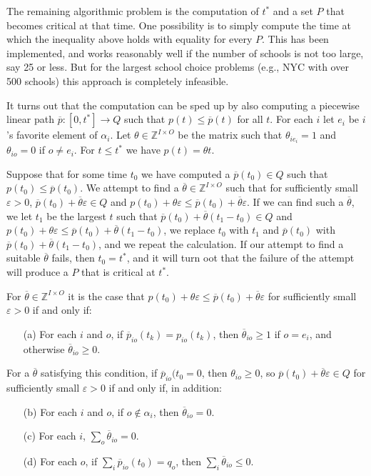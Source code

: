 \documentclass[12pt]{article}
\theoremstyle{definition}
\newcommand{\In}{\mathbb{Z}}
\newcommand{\barp}{\overline{p}}
\newcommand{\bartheta}{{\overline \theta}}
\newcommand{\varep}{\varepsilon}
\begin{document}
\begin{appendix}
The remaining algorithmic problem is the computation of $t^*$ and a
set $P$ that becomes critical at that time.  One possibility is to
simply compute the time at which the inequality above holds with
equality for every $P$.  This has been implemented, and works
reasonably well if the number of schools is not too large, say 25 or
less.  But for the largest school choice problems (e.g., NYC with over
500 schools) this approach is completely infeasible.

It turns out that the computation can be sped up by also computing a
piecewise linear path $\barp \colon [0,t^*] \to Q$ such that $p(t) \le
\barp(t)$ for all $t$.  For each $i$ let $e_i$ be $i$'s favorite
element of $\alpha_i$.  Let $\theta \in \In^{I \times O}$ be the
matrix such that $\theta_{ie_i} = 1$ and $\theta_{io} = 0$ if $o \ne
e_i$.  For $t \le t^*$ we have $p(t) = \theta t$.

Suppose that for some time $t_0$ we have computed a $\barp(t_0) \in Q$
such that $p(t_0) \le \barp(t_0)$.  We attempt to find a $\bartheta
\in \In^{I \times O}$ such that for sufficiently small $\varep > 0$,
$\barp(t_0) + \bartheta \varep \in Q$ and $p(t_0) + \theta \varep \le
\barp(t_0) + \bartheta \varep$.  If we can find such a $\bartheta$, we
let $t_1$ be the largest $t$ such that $\barp(t_0) + \bartheta (t_1 -
t_0) \in Q$ and $p(t_0) + \theta \varep \le \barp(t_0) + \bartheta
(t_1 - t_0)$, we replace $t_0$ with $t_1$ and $\barp(t_0)$ with
$\barp(t_0) + \bartheta (t_1 - t_0)$, and we repeat the calculation.
If our attempt to find a suitable $\bartheta$ fails, then $t_0 = t^*$,
and it will turn oot that the failure of the attempt will produce a $P$
that is critical at $t^*$.

For $\bartheta \in \In^{I \times O}$ it is the case that $p(t_0) +
\theta \varep \le \barp(t_0) + \bartheta \varep$ for sufficiently
small $\varep > 0$ if and only if:
\begin{enumerate} 
  \item[(a)] For each $i$ and $o$, if $\barp_{io}(t_k) = p_{io}(t_k)$, then
        $\bartheta_{io} \ge 1$ if $o = e_i$, and otherwise
        $\bartheta_{io} \ge 0$.
\end{enumerate}
For a $\bartheta$ satisfying this condition, if $\barp_{io}(t_0 = 0$,
then $\theta_{io} \ge 0$, so $\barp(t_0) + \bartheta \varep \in Q$ for
sufficiently small $\varep > 0$ if and only if, in addition:
\begin{enumerate} 
  \item[(b)] For each $i$ and $o$, if $o \notin \alpha_i$, then $\bartheta_{io} = 0$.
  \item[(c)] For each $i$, $\sum_o \bartheta_{io} = 0$.
  \item[(d)] For each $o$, if $\sum_i \barp_{io}(t_0) = q_o$, then $\sum_i \bartheta_{io} \le 0$.
\end{enumerate}


\end{appendix}
\end{document}
